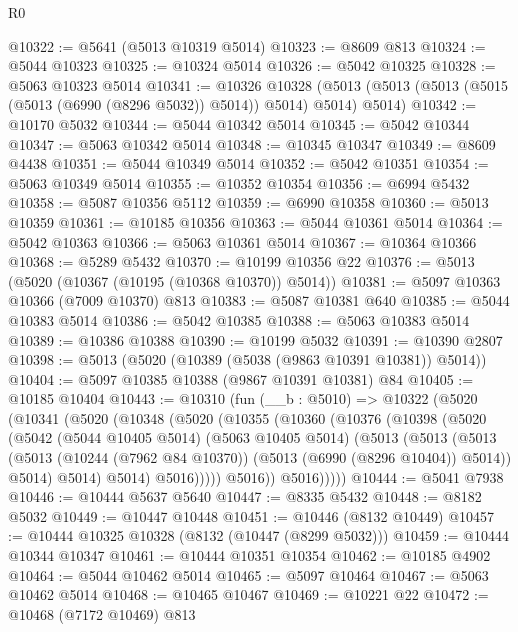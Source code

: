 \begin{lexlean}{R0}
\begin{coremodule}
@10322 := @5641 (@5013 @10319 @5014)
@10323 := @8609 @813
@10324 := @5044 @10323
@10325 := @10324 @5014
@10326 := @5042 @10325
@10328 := @5063 @10323 @5014
@10341 := @10326
    @10328
    (@5013 (@5013 (@5013 (@5015 (@5013 (@6990 (@8296 @5032)) @5014)) @5014) @5014) @5014)
@10342 := @10170 @5032
@10344 := @5044 @10342 @5014
@10345 := @5042 @10344
@10347 := @5063 @10342 @5014
@10348 := @10345 @10347
@10349 := @8609 @4438
@10351 := @5044 @10349 @5014
@10352 := @5042 @10351
@10354 := @5063 @10349 @5014
@10355 := @10352 @10354
@10356 := @6994 @5432
@10358 := @5087 @10356 @5112
@10359 := @6990 @10358
@10360 := @5013 @10359
@10361 := @10185 @10356
@10363 := @5044 @10361 @5014
@10364 := @5042 @10363
@10366 := @5063 @10361 @5014
@10367 := @10364 @10366
@10368 := @5289 @5432
@10370 := @10199 @10356 @22
@10376 := @5013 (@5020 (@10367 (@10195 (@10368 @10370)) @5014))
@10381 := @5097 @10363 @10366 (@7009 @10370) @813
@10383 := @5087 @10381 @640
@10385 := @5044 @10383 @5014
@10386 := @5042 @10385
@10388 := @5063 @10383 @5014
@10389 := @10386 @10388
@10390 := @10199 @5032
@10391 := @10390 @2807
@10398 := @5013 (@5020 (@10389 (@5038 (@9863 @10391 @10381)) @5014))
@10404 := @5097 @10385 @10388 (@9867 @10391 @10381) @84
@10405 := @10185 @10404
@10443 := @10310
    (fun (__b : @5010) =>
    @10322
      (@5020
        (@10341
          (@5020
            (@10348
              (@5020
                (@10355
                  (@10360
                    (@10376
                      (@10398
                        (@5020
                          (@5042
                            (@5044 @10405 @5014)
                            (@5063 @10405 @5014)
                            (@5013
                              (@5013
                                (@5013
                                  (@5013
                                    (@10244 (@7962 @84 @10370))
                                    (@5013 (@6990 (@8296 @10404)) @5014))
                                  @5014)
                                @5014)
                              @5014)
                            @5016)))))
                  @5016))
              @5016)))))
@10444 := @5041 @7938
@10446 := @10444 @5637 @5640
@10447 := @8335 @5432
@10448 := @8182 @5032
@10449 := @10447 @10448
@10451 := @10446 (@8132 @10449)
@10457 := @10444 @10325 @10328 (@8132 (@10447 (@8299 @5032)))
@10459 := @10444 @10344 @10347
@10461 := @10444 @10351 @10354
@10462 := @10185 @4902
@10464 := @5044 @10462 @5014
@10465 := @5097 @10464
@10467 := @5063 @10462 @5014
@10468 := @10465 @10467
@10469 := @10221 @22
@10472 := @10468 (@7172 @10469) @813

\end{coremodule}
\end{lexlean}
